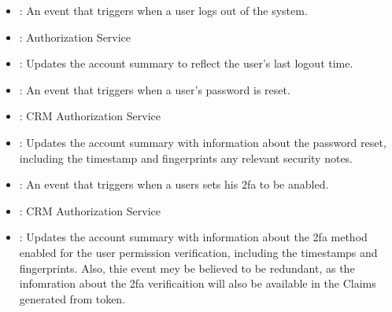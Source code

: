 \documentclass[letterpaper,10pt,english]{sphinxmanual}
\begin{document}
\sphinxAtStartPar
{}
\begin{itemize}
\item {} 
\sphinxAtStartPar
{}: An event that triggers when a user logs out of the system.

\item {} 
\sphinxAtStartPar
{}: Authorization Service

\item {} 
\sphinxAtStartPar
{}: Updates the account summary to reflect the user’s last logout time.

\end{itemize}

\sphinxAtStartPar
{}
\begin{itemize}
\item {} 
\sphinxAtStartPar
{}: An event that triggers when a user’s password is reset.

\item {} 
\sphinxAtStartPar
{}: CRM Authorization Service

\item {} 
\sphinxAtStartPar
{}: Updates the account summary with information about the password reset, including the timestamp and fingerprints any relevant security notes.

\end{itemize}

\sphinxAtStartPar
{}
\begin{itemize}
\item {} 
\sphinxAtStartPar
{}: An event that triggers when a users sets his 2fa to be anabled.

\item {} 
\sphinxAtStartPar
{}: CRM Authorization Service

\item {} 
\sphinxAtStartPar
{}: Updates the account summary with information about the 2fa method enabled for the user permission verification, including the timestamps and fingerprints. Also, thie event mey be believed to be redundant, as the infomration about the 2fa verificaition will also be available in the Claims generated from token.

\end{itemize}
\end{document}

